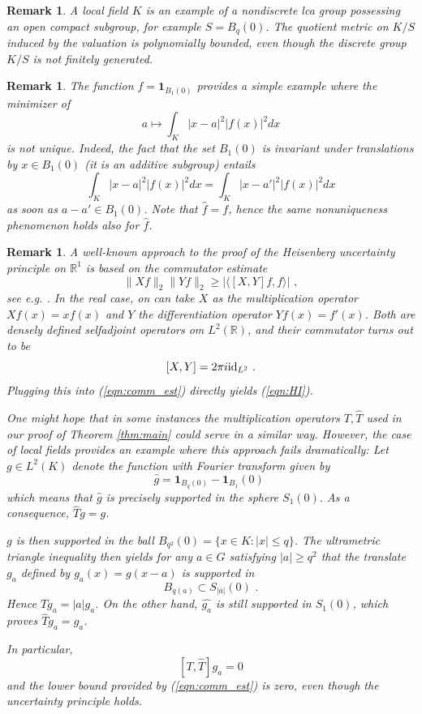 \documentclass[12pt, reqno]{amsart}
\newtheorem{remark}[theorem]{Remark}
\begin{document}
\begin{remark} \label{ex:non_fg}
    A local field $K$ is an example of a nondiscrete lca group possessing an open compact subgroup, for example $S = B_q(0)$. The quotient metric on $K/S$ induced by the valuation is polynomially bounded, even though the discrete group $K/S$ is not finitely generated.
\end{remark}

\begin{remark} \label{ex:counter_lf}
    The function $f = \mathbf{1}_{B_1(0)}$ provides a simple example where the minimizer of 
    \[
    a \mapsto \int_{K} |x-a|^2 |f(x)|^2 dx 
    \] is not unique. 
  Indeed, the fact that the set $B_1(0)$ is invariant under translations by $x \in B_1(0)$ (it is an additive subgroup) entails 
    \[
    \int_{K} |x-a|^2 |f(x)|^2 dx = \int_{K} |x-a'|^2 |f(x)|^2 dx
    \] as soon as $a-a' \in B_1(0)$. Note that $\widehat{f} = f$, hence the same nonuniqueness phenomenon holds also for $\widehat{f}$. 
\end{remark}

\begin{remark} 
A well-known approach to the proof of the Heisenberg uncertainty principle on $\mathbb{R}^1$ is based on the commutator estimate 
\begin{equation} \label{eqn:comm_est}
\| Xf \|_2 \| Y f \|_2 \ge |\langle [X,Y] f, f \rangle |\,\,,
\end{equation}
 see e.g. \cite[Lemma 2.1]{MR1448337}.
In the real case, on can take $X$ as the multiplication operator $Xf (x) = x f(x)$ and $Y$ the differentiation operator $Yf(x) = f'(x)$. Both are densely defined selfadjoint operators om $L^2(\mathbb{R})$, and their commutator turns out to be 
\[ [X,Y] = 2 \pi i {\rm id}_{L^2} \,\,.\] Plugging this into (\ref{eqn:comm_est}) directly yields (\ref{eqn:HI}).

One might hope that in some instances the multiplication operators $T, \widehat{T}$ used in our proof of Theorem \ref{thm:main} could serve in a similar way. However, the case of local fields provides an example where this approach fails dramatically: Let $g \in L^2(K)$ denote the function with Fourier transform given by 
\[ \widehat{g} = \mathbf{1}_{B_q(0)} - \mathbf{1}_{B_{1}}(0) \,\,\] which means that $\widehat{g}$ is precisely supported in the sphere 
$S_{1}(0)$. As a consequence, $\widehat{T} g = g$. 

$g$ is then supported in the ball $B_{q^2}(0) = \{ x \in K : |x| \le q \}$. The ultrametric triangle inequality then yields for any $a \in G$ satisfying $|a| \ge q^2$ that the translate $g_a$
defined by $g_a(x) = g(x-a)$ is supported in
\[ B_{q(a)} \subset S_{|a|}(0)\,\,.  \]  Hence $T g_a = |a| g_a$. On the other hand, $\widehat{g_a}$ is still supported in $S_{1}(0)$, which proves $\widehat{T} g_a = g_a$.

In particular, 
\[ [T,\widehat{T}] g_a = 0 \]
and the lower bound provided by (\ref{eqn:comm_est}) is zero, even though the uncertainty principle holds.  
\end{remark}
\end{document}
